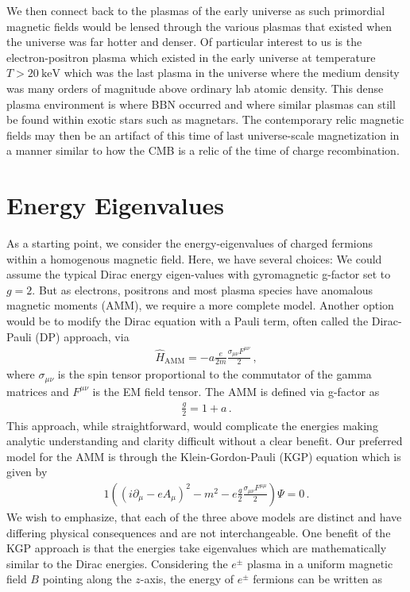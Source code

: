 \documentclass[Universe,article,submit,moreauthors,pdftex]{Definitions/mdpi}
\begin{document}
We then connect back to the plasmas of the early universe as such primordial magnetic fields would be lensed through the various plasmas that existed when the universe was far hotter and denser. Of particular interest to us is the electron-positron plasma which existed in the early universe at temperature $T>20\ \mathrm{keV}$ which was the last plasma in the universe where the medium density was many orders of magnitude above ordinary lab atomic density. This dense plasma environment is where BBN occurred and where similar plasmas can still be found within exotic stars such as magnetars. The contemporary relic magnetic fields may then be an artifact of this time of last universe-scale magnetization in a manner similar to how the CMB is a relic of the time of charge recombination. 
\section{Energy Eigenvalues}\label{sec:energy}
\noindent As a starting point, we consider the energy-eigenvalues of charged fermions within a homogenous magnetic field. Here, we have several choices: We could assume the typical Dirac energy eigen-values with gyromagnetic g-factor set to $g=2$. But as electrons, positrons and most plasma species have anomalous magnetic moments (AMM), we require a more complete model. Another option would be to modify the Dirac equation with a Pauli term, often called the Dirac-Pauli (DP) approach, via
\begin{align}
  \label{Pauli} \hat{H}_{\mathrm{AMM}} = -a\frac{e}{2m}\frac{\sigma_{\mu\nu}F^{\mu\nu}}{2}\,,
\end{align}
where $\sigma_{\mu\nu}$ is the spin tensor proportional to the commutator of the gamma matrices and $F^{\mu\nu}$ is the EM field tensor. The AMM is defined via g-factor as
\begin{align}
  \label{AMM} \frac{g}{2}=1+a\,.
\end{align}
This approach, while straightforward, would complicate the energies making analytic understanding and clarity difficult without a clear benefit. Our preferred model for the AMM is through the Klein-Gordon-Pauli (KGP) equation which is given by
\begin{alignat}{1}
  \label{KGP} \left(\left(i\partial_{\mu}-eA_{\mu}\right)^{2}-m^{2}-e\frac{g}{2}\frac{\sigma_{\mu\nu}F^{\mu\mu}}{2}\right)\Psi=0\,.
\end{alignat}
We wish to emphasize, that each of the three above models are distinct and have differing physical consequences and are not interchangeable. One benefit of the KGP approach is that the energies take eigenvalues which are mathematically similar to the Dirac energies. Considering the $e^\pm$ plasma in a uniform magnetic field $B$ pointing along the $z$-axis, the energy of $e^\pm$ fermions can be written as
\end{document}
